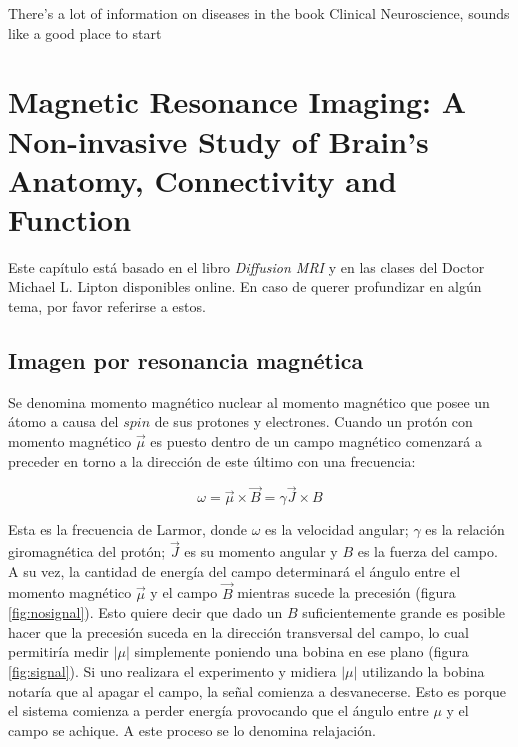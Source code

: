 There's a lot of information on diseases in the book Clinical Neuroscience,
sounds like a good place to start


\chapter{Magnetic Resonance Imaging: A Non-invasive Study of Brain's Anatomy, Connectivity and Function}
\label{ch:bkgrnd}

Este cap\'itulo est\'a basado en el libro \textit{Diffusion MRI} 
\cite{Basser2009} y en las clases del Doctor Michael L. Lipton 
\cite{Lipton2014} disponibles online. En caso de querer profundizar en 
alg\'un tema, por favor referirse a estos. 

\section{Imagen por resonancia magnética}
Se denomina momento magn\'etico nuclear al momento magn\'etico que posee
un \'atomo a causa del $spin$ de sus protones y electrones. Cuando un 
prot\'on con momento magn\'etico $\vec{\mu}$ es puesto dentro de un campo
magn\'etico comenzar\'a a preceder en torno a la direcci\'on de este
\'ultimo con una frecuencia: 

$$ \omega = \vec{\mu} \times \vec{B} = \gamma \vec{J} \times B $$

Esta es la frecuencia de Larmor, donde $\omega$ es la velocidad angular;
$\gamma$ es la relaci\'on giromagn\'etica del prot\'on; $\vec{J}$ es su
momento angular y $B$ es la fuerza del campo. A su vez, la cantidad de
energ\'ia del campo determinar\'a el \'angulo entre el momento magn\'etico
$\vec{\mu}$ y el campo $\vec{B}$ mientras sucede la precesi\'on (figura
\ref{fig:nosignal}). Esto quiere decir que dado un $B$ suficientemente
grande es posible hacer que la precesi\'on suceda en la direcci\'on
transversal del campo, lo cual permitir\'ia medir $|\mu|$ simplemente
poniendo una bobina en ese plano (figura \ref{fig:signal}). Si uno
realizara el experimento y midiera $|\mu|$ utilizando la bobina notar\'ia
que al apagar el campo, la se\~nal comienza a desvanecerse. Esto es porque
el sistema comienza a perder energ\'ia provocando que el \'angulo entre 
$\mu$ y el campo se achique. A este proceso se lo denomina relajaci\'on. \\

